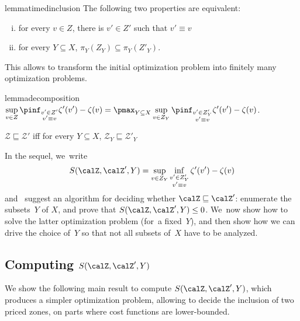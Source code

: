 \begin{restatable}{lemma}{timedinclusion}
  \label{lemma:timed_inclusion}
  The following two properties are equivalent:
  \begin{enumerate}[(i)]
  \item for every $v \in Z$, there is $v' \in Z'$ such that $v'
    \equiv v$
  \item for every $Y \subseteq X$, $\pi_Y(Z_Y) \subseteq \pi_Y(Z'_Y)$.
  \end{enumerate}
\end{restatable}

This allows to transform the initial optimization problem into
finitely many optimization problems.

\begin{restatable}{lemma}{decomposition}
  \label{lemma:decompos}
  \quad \(
  \displaystyle
  \sup_{v \in Z} \pinf_{\substack{v' \in Z'\\v' \equiv v}} \zeta'(v')
  - \zeta(v) = \pmax_{Y \subseteq X} \sup_{v \in Z_Y}
  \pinf_{\substack{v' \in Z'_Y\\v' \equiv v}} \zeta'(v') - \zeta(v)
  \).
\end{restatable}

\begin{corollary}
  \label{coro:decompos}
  $\mathcal{Z} \sqsubseteq \mathcal{Z}'$ iff for every $Y \subseteq
  X$, $\mathcal{Z}_Y \sqsubseteq \mathcal{Z}'_Y$
\end{corollary}

In the sequel, we~write 
\[
S(\calZ,\calZ',Y)=\sup_{v \in Z_Y} \inf_{\substack{v' \in Z'_Y \\ v' \equiv v}}
\zeta'(v') - \zeta(v)
\]
 and~ suggest an
algorithm for deciding whether $\calZ \sqsubseteq \calZ'$: enumerate
the subsets~$Y$ of $X$, and prove that $S(\calZ,\calZ',Y) \le
0$. 
We~now show how to solve the latter optimization problem (for~a
fixed~$Y$), and then show how we can drive the choice of~$Y$ so that
not all subsets of~$X$ have to be analyzed.

\subsection{Computing $S(\calZ,\calZ',Y)$}

We show the following main result to compute $S(\calZ,\calZ',Y)$,
which produces a simpler optimization problem, allowing to decide the
inclusion of two priced zones, on parts where cost functions are
lower-bounded.

